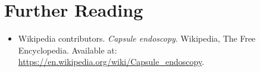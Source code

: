 \section{Further Reading}
\begin{itemize}
  \item Wikipedia contributors. \textit{Capsule endoscopy}. Wikipedia, The Free Encyclopedia. Available at: \url{https://en.wikipedia.org/wiki/Capsule_endoscopy}.
\end{itemize}
